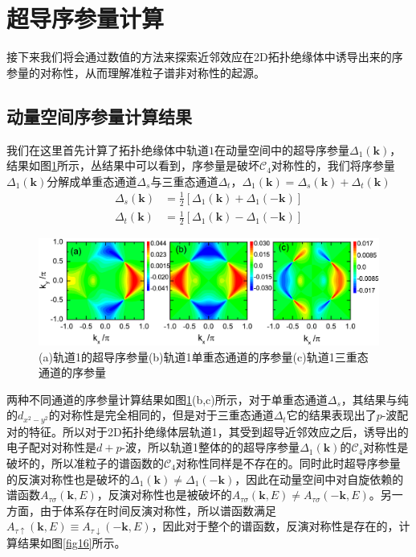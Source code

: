 \section{超导序参量计算}
接下来我们将会通过数值的方法来探索近邻效应在2D拓扑绝缘体中诱导出来的序参量的对称性，从而理解准粒子谱非对称性的起源。
\subsection{动量空间序参量计算结果}
我们在这里首先计算了拓扑绝缘体中轨道$1$在动量空间中的超导序参量$\Delta_1(\mathbf{k})$，结果如图\ref{fig19}所示，丛结果中可以看到，序参量是破坏$\mathcal{C}_4$对称性的，我们将序参量$\Delta_1(\mathbf{k})$分解成单重态通道$\Delta_s$与三重态通道$\Delta_t$，$\Delta_1(\mathbf{k})=\Delta_s(\mathbf{k})+\Delta_t(\mathbf{k})$
\begin{equation}
\begin{aligned}
\Delta_s(\mathbf{k})&=\frac{1}{2}\left[\Delta_1(\mathbf{k})+\Delta_1(\mathbf{-k})\right]\\
\Delta_t(\mathbf{k})&=\frac{1}{2}\left[\Delta_1(\mathbf{k})-\Delta_1(\mathbf{-k})\right]
\end{aligned}
\end{equation}
\begin{figure}[h]
\centering
\includegraphics[scale=0.7]{pic/fig20}
\caption{(a)轨道1的超导序参量(b)轨道1单重态通道的序参量(c)轨道1三重态通道的序参量}\label{fig19}
\end{figure}
两种不同通道的序参量计算结果如图\ref{fig19}(b,c)所示，对于单重态通道$\Delta_s$，其结果与纯的$d_{x^2-y^2}$的对称性是完全相同的，但是对于三重态通道$\Delta_t$它的结果表现出了$p$-波配对的特征。所以对于2D拓扑绝缘体层轨道1，其受到超导近邻效应之后，诱导出的电子配对对称性是$d+p$-波，所以轨道1整体的的超导序参量$\Delta_1(\mathbf{k})$的$\mathcal{C}_4$对称性是破坏的，所以准粒子的谱函数的$\mathcal{C}_4$对称性同样是不存在的。同时此时超导序参量的反演对称性也是破坏的$\Delta_1(\mathbf{k})\neq\Delta_1(\mathbf{-k})$，因此在动量空间中对自旋依赖的谱函数$A_{\tau\sigma}(\mathbf{k},E)$，反演对称性也是被破坏的$A_{\tau\sigma}(\mathbf{k},E)\neq A_{\tau\sigma}(-\mathbf{k},E)$。另一方面，由于体系存在时间反演对称性，所以谱函数满足$A_{\tau\uparrow}(\mathbf{k},E)\equiv A_{\tau\downarrow}(-\mathbf{k},E)$，因此对于整个的谱函数，反演对称性是存在的，计算结果如图\ref{fig16}所示。
